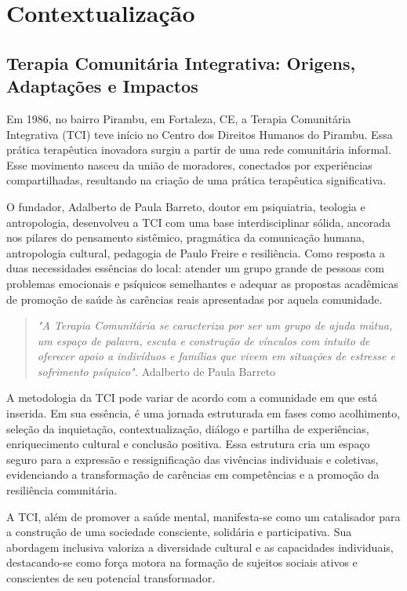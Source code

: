 \part{Contextualização}

\chapter{Terapia Comunitária Integrativa: Origens, Adaptações e Impactos}
Em 1986, no bairro Pirambu, em Fortaleza, CE, a Terapia Comunitária Integrativa (TCI) teve início no Centro dos Direitos Humanos do Pirambu. Essa prática terapêutica inovadora surgiu a partir de uma rede comunitária informal. Esse movimento nasceu da união de moradores, conectados por experiências compartilhadas, resultando na criação de uma prática terapêutica significativa. 

O fundador, Adalberto de Paula Barreto, doutor em psiquiatria, teologia e antropologia, desenvolveu a TCI com uma base interdisciplinar sólida, ancorada nos pilares do pensamento sistêmico, pragmática da comunicação humana, antropologia cultural, pedagogia de Paulo Freire e resiliência. Como resposta a duas necessidades essências do local: atender um grupo grande de pessoas com problemas emocionais e psíquicos semelhantes e adequar as propostas acadêmicas de promoção de saúde às carências reais apresentadas por aquela comunidade.\cite{BARRETO}

\begin{quote}
\textit{"A Terapia Comunitária se caracteriza por ser um grupo de ajuda mútua, um espaço de palavra, escuta e construção de vínculos com intuito de oferecer apoio a indivíduos e famílias que vivem em situações de estresse e sofrimento psíquico".}
Adalberto de Paula Barreto
\end{quote}

A metodologia da TCI pode variar de acordo com a comunidade em que está inserida. Em sua essência, é uma jornada estruturada em fases como acolhimento, seleção da inquietação, contextualização, diálogo e partilha de experiências, enriquecimento cultural e conclusão positiva. Essa estrutura cria um espaço seguro para a expressão e ressignificação das vivências individuais e coletivas, evidenciando a transformação de carências em competências e a promoção da resiliência comunitária.\cite{SILVA}

A TCI, além de promover a saúde mental, manifesta-se como um catalisador para a construção de uma sociedade consciente, solidária e participativa. Sua abordagem inclusiva valoriza a diversidade cultural e as capacidades individuais, destacando-se como força motora na formação de sujeitos sociais ativos e conscientes de seu potencial transformador.\cite{BARRETO}

